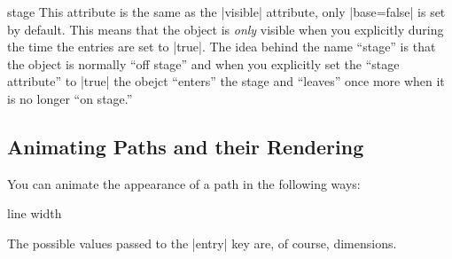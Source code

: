\begin{animateattribute}{stage}
  This attribute is the same as the |visible| attribute, only
  |base=false| is set by default. This means that the object is
  \emph{only} visible when you explicitly during the time the entries
  are set to |true|. The idea behind the name ``stage'' is that the
  object is normally ``off stage'' and when you explicitly set the
  ``stage attribute'' to |true| the obejct ``enters'' the stage and
  ``leaves'' once more when it is no longer ``on stage.''
  
\begin{codeexample}[animation list={-1,0,1,2,3},animation bb={(1.3,-0.7) rectangle (2.7,0.7)}]
\end{codeexample}
\end{animateattribute}



\subsection{Animating Paths and their Rendering}
\label{section-base-animation-paths}

You can animate the appearance of a path in the following ways:

\begin{animateattribute}{line width}
\begin{codeexample}[animation list={0.5,1,1.5,2}]
\end{codeexample}
  The possible values passed to the |entry| key are, of course,
  dimensions. 
\end{animateattribute}


